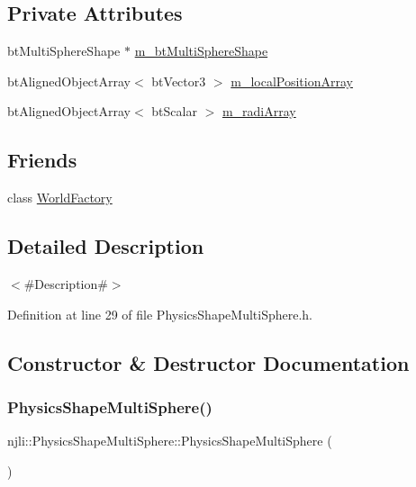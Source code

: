\subsection*{Private Attributes}
\begin{DoxyCompactItemize}
\item 
bt\+Multi\+Sphere\+Shape $\ast$ \mbox{\hyperlink{classnjli_1_1_physics_shape_multi_sphere_ac43b193d22e235ea71f17d93021e0967}{m\+\_\+bt\+Multi\+Sphere\+Shape}}
\item 
bt\+Aligned\+Object\+Array$<$ bt\+Vector3 $>$ \mbox{\hyperlink{classnjli_1_1_physics_shape_multi_sphere_a20192615e273ac465050fb139edcae76}{m\+\_\+local\+Position\+Array}}
\item 
bt\+Aligned\+Object\+Array$<$ bt\+Scalar $>$ \mbox{\hyperlink{classnjli_1_1_physics_shape_multi_sphere_a9a7781979e6a9f6b62e5c621b14ccc6c}{m\+\_\+radi\+Array}}
\end{DoxyCompactItemize}
\subsection*{Friends}
\begin{DoxyCompactItemize}
\item 
class \mbox{\hyperlink{classnjli_1_1_physics_shape_multi_sphere_acb96ebb09abe8f2a37a915a842babfac}{World\+Factory}}
\end{DoxyCompactItemize}


\subsection{Detailed Description}
$<$\#\+Description\#$>$ 

Definition at line 29 of file Physics\+Shape\+Multi\+Sphere.\+h.



\subsection{Constructor \& Destructor Documentation}
\mbox{\label{classnjli_1_1_physics_shape_multi_sphere_abaccfac08f371c6f00f234abaffe5252}} 
\subsubsection{\texorpdfstring{Physics\+Shape\+Multi\+Sphere()}{PhysicsShapeMultiSphere()}\hspace{0.1cm}{\footnotesize\ttfamily [1/3]}}
{\footnotesize\ttfamily njli\+::\+Physics\+Shape\+Multi\+Sphere\+::\+Physics\+Shape\+Multi\+Sphere (\begin{DoxyParamCaption}{ }\end{DoxyParamCaption})\hspace{0.3cm}{\ttfamily [protected]}}

